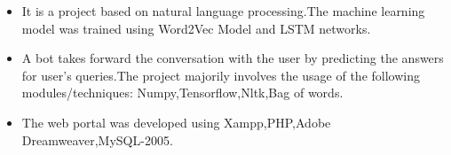 \documentclass[10pt,a4paper]{altacv}
\begin{document}
\begin{itemize}
\item It is a project based on natural language processing.The machine learning model was trained using Word2Vec Model and LSTM networks.
\end{itemize}

\begin{itemize}
\item A bot takes forward the conversation with the user by predicting the answers for user's queries.The project majorily involves the usage of the following modules/techniques:
Numpy,Tensorflow,Nltk,Bag of words.
\end{itemize}

\begin{itemize}
\item The web portal was developed using Xampp,PHP,Adobe Dreamweaver,MySQL-2005.
\end{itemize}

\medskip

\clearpage


\end{document}
